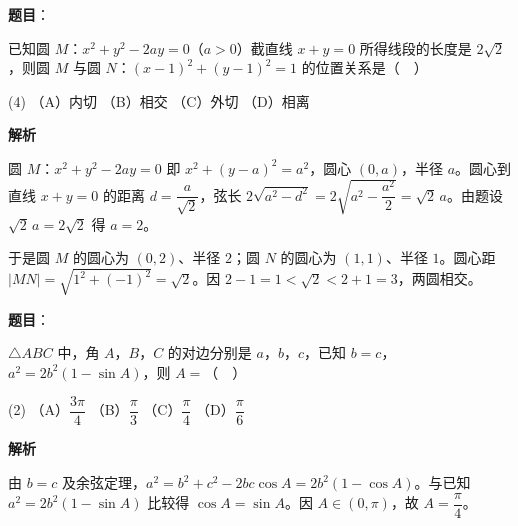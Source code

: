 \begin{answer}

\textbf{题目}：

已知圆 \(M\)：\(x^2+y^2-2ay=0\)（\(a>0\)）截直线 \(x+y=0\) 所得线段的长度是 \(2\sqrt{2}\)，则圆 \(M\) 与圆 \(N\)：\((x-1)^2+(y-1)^2=1\) 的位置关系是（　）

\begin{gkopts}(4)
\task （A）内切
\task （B）相交
\task （C）外切
\task （D）相离
\end{gkopts}

\textbf{解析}

圆 \(M\)：\(x^{2}+y^{2}-2ay=0\) 即 \(x^{2}+(y-a)^{2}=a^{2}\)，圆心 \((0,a)\)，半径 \(a\)。圆心到直线 \(x+y=0\) 的距离 \(d=\dfrac{a}{\sqrt{2}}\)，弦长 \(2\sqrt{a^{2}-d^{2}}=2\sqrt{a^{2}-\dfrac{a^{2}}{2}}=\sqrt{2}\,a\)。由题设 \(\sqrt{2}\,a=2\sqrt{2}\) 得 \(a=2\)。

于是圆 \(M\) 的圆心为 \((0,2)\)、半径 \(2\)；圆 \(N\) 的圆心为 \((1,1)\)、半径 \(1\)。圆心距 \(|MN|=\sqrt{1^{2}+(-1)^{2}}=\sqrt{2}\)。因 \(2-1=1<\sqrt{2}<2+1=3\)，两圆相交。


\end{answer}
\begin{answer}

\textbf{题目}：

\(\triangle ABC\) 中，角 \(A\)，\(B\)，\(C\) 的对边分别是 \(a\)，\(b\)，\(c\)，已知 \(b=c\)，\(a^2=2b^2(1-\sin A)\)，则 \(A=\)（　）

\begin{gkopts}(2)
\task （A）\(\dfrac{3\pi}{4}\)
\task （B）\(\dfrac{\pi}{3}\)
\task （C）\(\dfrac{\pi}{4}\)
\task （D）\(\dfrac{\pi}{6}\)
\end{gkopts}

\textbf{解析}

由 \(b=c\) 及余弦定理，\(a^{2}=b^{2}+c^{2}-2bc\cos A=2b^{2}(1-\cos A)\)。与已知 \(a^{2}=2b^{2}(1-\sin A)\) 比较得 \(\cos A=\sin A\)。因 \(A\in(0,\pi)\)，故 \(A=\dfrac{\pi}{4}\)。


\end{answer}
